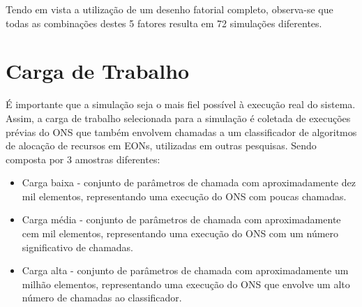 Tendo em vista a utilização de um desenho fatorial completo, observa-se que todas as combinações destes 5 fatores resulta em 72 simulações diferentes.

\section{Carga de Trabalho}

É importante que a simulação seja o mais fiel possível à execução real do sistema. Assim, a carga de trabalho selecionada para a simulação é coletada de execuções prévias do ONS que também envolvem chamadas a um classificador de algoritmos de alocação de recursos em EONs, utilizadas em outras pesquisas. Sendo composta por 3 amostras diferentes:

\begin{itemize}
  \item Carga baixa - conjunto de parâmetros de chamada com aproximadamente dez mil elementos, representando uma execução do ONS com poucas chamadas.
  \item Carga média - conjunto de parâmetros de chamada com aproximadamente cem mil elementos, representando uma execução do ONS com um número significativo de chamadas.
  \item Carga alta - conjunto de parâmetros de chamada com aproximadamente um milhão elementos, representando uma execução do ONS que envolve um alto número de chamadas ao classificador.
\end{itemize}
